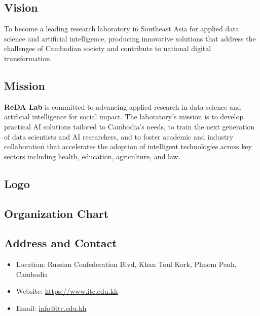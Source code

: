 \subsection{Vision}

\hs To become a leading research laboratory in Southeast Asia for applied data science
and artificial intelligence, producing innovative solutions that address the challenges
of Cambodian society and contribute to national digital transformation.

\subsection{Mission}

\hs \textbf{ReDA Lab} is committed to advancing applied research in data science and
artificial intelligence for social impact. The laboratory's mission is to develop
practical AI solutions tailored to Cambodia's needs, to train the next generation of
data scientists and AI researchers, and to foster academic and industry collaboration
that accelerates the adoption of intelligent technologies across key sectors including
health, education, agriculture, and law.

\subsection{Logo}


\subsection{Organization Chart}



\subsection{Address and Contact}
\begin{itemize}
    \item Location: Russian Confederation Blvd, Khan Toul Kork, Phnom Penh, Cambodia
    \item Website: \url{https://www.itc.edu.kh}
    \item Email: \url{info@itc.edu.kh}
\end{itemize}

